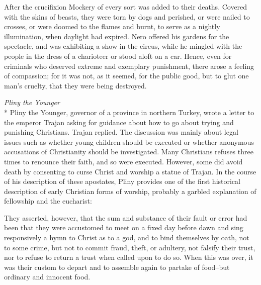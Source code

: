 \documentclass[10pt,twoside]{article} %
\newcommand{\quotesize}{\normalsize{}}
\newcommand{\comm}[1]{\begingroup \color{black!50} #1\endgroup}
\newenvironment{quotetext}{\begingroup\quotesize}{\endgroup}
\newcommand{\subhead}[1]{\emph{#1}\\*}
\begin{document}
\begin{section}{After the crucifixion}
\begin{quotetext}
Mockery of every sort was added to their deaths. Covered with the
skins of beasts, they were torn by dogs and perished, or were nailed
to crosses, or were doomed to the flames and burnt, to serve as a
nightly illumination, when daylight had expired. Nero offered his
gardens for the spectacle, and was exhibiting a show in the circus,
while he mingled with the people in the dress of a charioteer or stood
aloft on a car. Hence, even for criminals who deserved extreme and
exemplary punishment, there arose a feeling of compassion; for it was
not, as it seemed, for the public good, but to glut one man's cruelty,
that they were being destroyed.
\end{quotetext}

\subhead{Pliny the Younger}
%
%
\comm{Pliny the Younger, governor of a province in northern Turkey, wrote a letter to the emperor Trajan
asking for guidance about how to go about trying and punishing Christians. Trajan replied. The discussion was
mainly about legal issues such as whether young children should be executed or whether anonymous accusations
of Christianity should be investigated. Many Christians refuses three times to renounce their faith, and so were
executed. However, some did avoid death by consenting to curse Christ and worship a statue of Trajan. In the course
of his description of these apostates, Pliny provides one of the first historical description of early Christian
forms of worship, probably a garbled explanation of fellowship and the eucharist:}

\begin{quotetext}
They asserted, however, that the sum and substance of their fault or error had been that they were accustomed to meet on a fixed day before dawn and sing responsively a hymn to Christ as to a god, and to bind themselves by oath, not to some crime, but not to commit fraud, theft, or adultery, not falsify their trust, nor to refuse to return a trust when called upon to do so. When this was over, it was their custom to depart and to assemble again to partake of food--but ordinary and innocent food.
\end{quotetext}

\end{section}

\vfill\pagebreak

\end{document}
